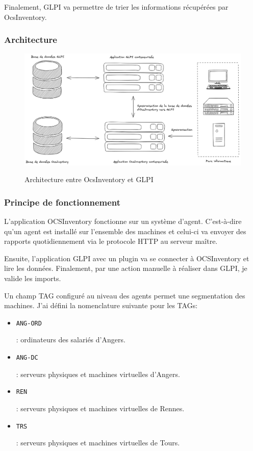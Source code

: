 \documentclass[12pt]{article}
\begin{document}
Finalement, \gls{GLPI} va permettre de trier les informations récupérées par OcsInventory.

\subsubsection{Architecture}
\begin{figure}[!ht]
    \centering
    \includegraphics[width=\textwidth]{src/Fonctionne GLPI.png}
    \label{fig:glpi}
    \caption{Architecture entre OcsInventory et \gls{GLPI}}
\end{figure}

\newpage
\subsubsection{Principe de fonctionnement}
L'application \gls{OCSInventory} fonctionne sur un système d'agent.
C'est-à-dire qu'un agent est installé sur l'ensemble des machines et celui-ci va envoyer des rapports quotidiennement via le protocole HTTP au serveur maître. 

Ensuite, l'application \gls{GLPI} avec un plugin va se connecter à \gls{OCSInventory} et lire les données.
Finalement, par une action manuelle à réaliser dans \gls{GLPI}, je valide les imports.

Un champ TAG configuré au niveau des agents permet une segmentation des machines.
J'ai défini la nomenclature suivante pour les TAGs:
\begin{itemize}
    \item \begin{code} \texttt{ANG-ORD} \end{code}: ordinateurs des salariés d'Angers.
    \item \begin{code} \texttt{ANG-DC} \end{code}: serveurs physiques et machines virtuelles d'Angers.
    \item \begin{code} \texttt{REN} \end{code}: serveurs physiques et machines virtuelles de Rennes.
    \item \begin{code} \texttt{TRS} \end{code}: serveurs physiques et machines virtuelles de Tours.
\end{itemize}
\end{document}
